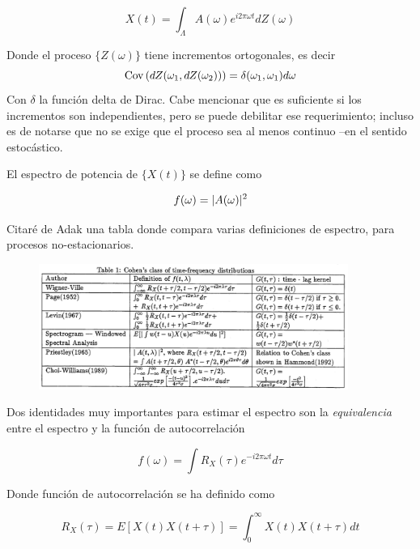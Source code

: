 \begin{equation*}
X(t) = \int_{\Lambda} A(\omega) e^{i 2\pi \omega t} dZ(\omega)
\end{equation*}

Donde el proceso $\{ Z(\omega) \}$ tiene incrementos ortogonales, es decir 
\begin{equation*}
\mathrm{Cov}\left( dZ(\omega_1,dZ(\omega_2)) \right) = \delta(\omega_1,\omega_1) d\omega
\end{equation*}
Con $\delta$ la funci\'on delta de Dirac. Cabe mencionar que es suficiente si los incrementos
son independientes, pero se puede debilitar ese requerimiento; incluso es de notarse que no
se exige que el proceso sea al menos continuo --en el sentido estoc\'astico.

El espectro de potencia de $\{X(t)\}$ se define como

\begin{equation*}
f(\omega) = \lvert A(\omega) \rvert^{2}
\end{equation*}

Citar\'e de Adak \cite{Adak98} una tabla donde compara varias definiciones de espectro, para
procesos no-estacionarios.

\begin{figure}[h]
\centering
\includegraphics[width=0.9\textwidth]{tabla.png} 
\end{figure}

Dos identidades muy importantes para estimar el espectro son la \textit{equivalencia} entre
el espectro y la funci\'on de autocorrelaci\'on

\begin{equation*}
f(\omega ) = \int R_X(\tau ) e^{-i 2\pi \omega t} d\tau
\end{equation*}

Donde funci\'on de autocorrelaci\'on se ha definido como

\begin{equation*}
R_X(\tau) = E\left[ X(t) X(t+\tau) \right] = \int_0^{\infty} X(t)X(t+\tau) dt
\end{equation*}

